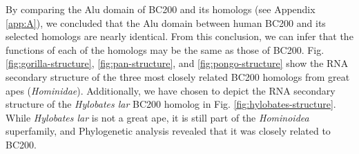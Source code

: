 \documentclass[conference, 11pt]{IEEEtran}
\begin{document}
By comparing the Alu domain of BC200 and its homologs (see Appendix \ref{app:A}), we concluded that the Alu domain between human BC200 and its selected homologs are nearly identical. 
From this conclusion, we can infer that the functions of each of the homologs may be the same as those of BC200. 
Fig. \ref{fig:gorilla-structure}, \ref{fig:pan-structure}, and \ref{fig:pongo-structure} show the RNA secondary structure of the three most closely related BC200 homologs from great apes (\emph{Hominidae}). 
Additionally, we have chosen to depict the RNA secondary structure of the \emph{Hylobates lar} BC200 homolog in Fig. \ref{fig:hylobates-structure}. 
While \emph{Hylobates lar} is not a great ape, it is still part of the \emph{Hominoidea} superfamily, and Phylogenetic analysis revealed that it was closely related to BC200.
\end{document}

